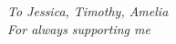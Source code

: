 \begin{dedication}
    \centering \huge \itshape
    To Jessica, Timothy, Amelia\\
    For always supporting me
\end{dedication}
